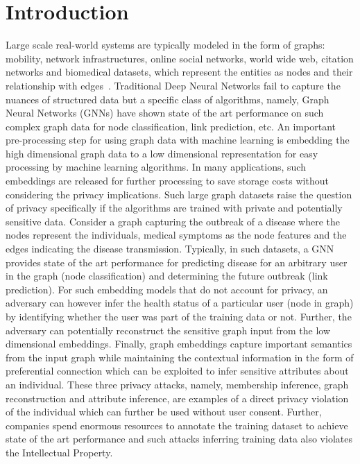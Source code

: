 \section{Introduction}\label{introduction}


Large scale real-world systems are typically modeled in the form of graphs: mobility, network infrastructures, online social networks, world wide web, citation networks and biomedical datasets, which represent the entities as nodes and their relationship with edges~\cite{zhou2018graph}.
Traditional Deep Neural Networks fail to capture the nuances of structured data but a specific class of algorithms, namely, Graph Neural Networks (GNNs) have shown state of the art performance on such complex graph data for node classification, link prediction, etc.
An important pre-processing step for using graph data with machine learning is embedding the high dimensional graph data to a low dimensional representation for easy processing by machine learning algorithms.
In many applications, such embeddings are released for further processing to save storage costs without considering the privacy implications.
Such large graph datasets raise the question of privacy specifically if the algorithms are trained with private and potentially sensitive data.
Consider a graph capturing the outbreak of a disease where the nodes represent the individuals, medical symptoms as the node features and the edges indicating the disease transmission.
Typically, in such datasets, a GNN provides state of the art performance for predicting disease for an arbitrary user in the graph (node classification) and determining the future outbreak (link prediction).
For such embedding models that do not account for privacy, an adversary can however infer the health status of a particular user (node in graph) by identifying whether the user was part of the training data or not.
Further, the adversary can potentially reconstruct the sensitive graph input from the low dimensional embeddings. %
Finally, graph embeddings capture important semantics from the input graph while maintaining the contextual information in the form of preferential connection which can be exploited to infer sensitive attributes about an individual.
These three privacy attacks, namely, membership inference, graph reconstruction and attribute inference, are examples of a direct privacy violation of the individual which can further be used without user consent. %
Further, companies spend enormous resources to annotate the training dataset to achieve state of the art performance and such attacks inferring training data also violates the Intellectual Property.


